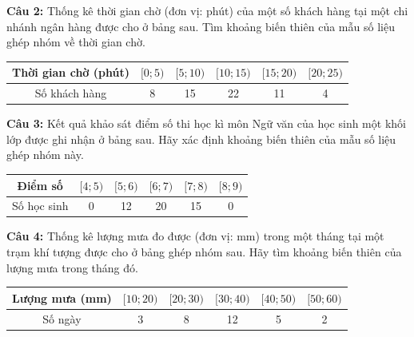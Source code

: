 \documentclass[12pt]{article}
\begin{document}
	\vspace{4mm}
	
	\noindent \textbf{Câu 2:} Thống kê thời gian chờ (đơn vị: phút) của một số khách hàng tại một chi nhánh ngân hàng được cho ở bảng sau. Tìm khoảng biến thiên của mẫu số liệu ghép nhóm về thời gian chờ.
	\begin{center}
		\renewcommand{\arraystretch}{1.3}
		\begin{tabular}{|c|c|c|c|c|c|}
			\hline
			Thời gian chờ (phút) & $[0; 5)$ & $[5; 10)$ & $[10; 15)$ & $[15; 20)$ & $[20; 25)$ \\
			\hline
			Số khách hàng & 8 & 15 & 22 & 11 & 4 \\
			\hline
		\end{tabular}
	\end{center}
	
	\vspace{4mm}
	
	\noindent \textbf{Câu 3:} Kết quả khảo sát điểm số thi học kì môn Ngữ văn của học sinh một khối lớp được ghi nhận ở bảng sau. Hãy xác định khoảng biến thiên của mẫu số liệu ghép nhóm này.
	\begin{center}
		\renewcommand{\arraystretch}{1.3}
		\begin{tabular}{|c|c|c|c|c|c|}
			\hline
			Điểm số & $[4; 5)$ & $[5; 6)$ & $[6; 7)$ & $[7; 8)$ & $[8; 9)$ \\
			\hline
			Số học sinh & 0 & 12 & 20 & 15 & 0 \\
			\hline
		\end{tabular}
	\end{center}
	
	\vspace{4mm}
	
	\noindent \textbf{Câu 4:} Thống kê lượng mưa đo được (đơn vị: mm) trong một tháng tại một trạm khí tượng được cho ở bảng ghép nhóm sau. Hãy tìm khoảng biến thiên của lượng mưa trong tháng đó.
	\begin{center}
		\renewcommand{\arraystretch}{1.3}
		\begin{tabular}{|c|c|c|c|c|c|}
			\hline
			Lượng mưa (mm) & $[10; 20)$ & $[20; 30)$ & $[30; 40)$ & $[40; 50)$ & $[50; 60)$ \\
			\hline
			Số ngày & 3 & 8 & 12 & 5 & 2 \\
			\hline
		\end{tabular}
	\end{center}
	
	\vspace{4mm}
	
\end{document}
